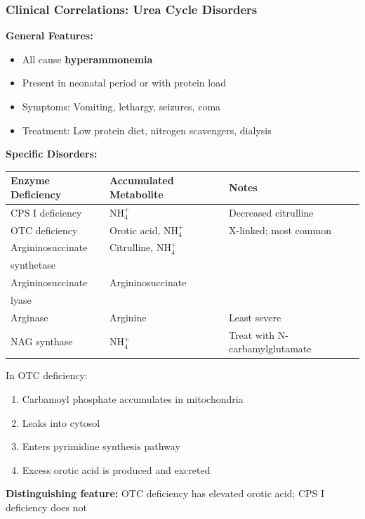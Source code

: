 \subsubsection{Clinical Correlations: Urea Cycle Disorders}

\begin{tcolorbox}[colback=red!5, colframe=red!70!black, title=\textbf{Urea Cycle Disorders}]
\textbf{General Features:}
\begin{itemize}
    \item All cause \textbf{hyperammonemia}
    \item Present in neonatal period or with protein load
    \item Symptoms: Vomiting, lethargy, seizures, coma
    \item Treatment: Low protein diet, nitrogen scavengers, dialysis
\end{itemize}

\textbf{Specific Disorders:}

\begin{center}
\begin{tabular}{lll}
\toprule
\textbf{Enzyme Deficiency} & \textbf{Accumulated Metabolite} & \textbf{Notes} \\
\midrule
CPS I deficiency & NH$_4^+$ & Decreased citrulline \\
OTC deficiency & Orotic acid, NH$_4^+$ & X-linked; most common \\
Argininosuccinate & Citrulline, NH$_4^+$ & \\
\quad synthetase & & \\
Argininosuccinate & Argininosuccinate & \\
\quad lyase & & \\
Arginase & Arginine & Least severe \\
NAG synthase & NH$_4^+$ & Treat with N-carbamylglutamate \\
\bottomrule
\end{tabular}
\end{center}
\end{tcolorbox}

\begin{tcolorbox}[colback=purple!5, colframe=purple!70!black, title=\textbf{Why Orotic Acid in OTC Deficiency?}]
In OTC deficiency:
\begin{enumerate}
    \item Carbamoyl phosphate accumulates in mitochondria
    \item Leaks into cytosol
    \item Enters pyrimidine synthesis pathway
    \item Excess orotic acid is produced and excreted
\end{enumerate}

\textbf{Distinguishing feature:} OTC deficiency has elevated orotic acid; CPS I deficiency does not
\end{tcolorbox}


